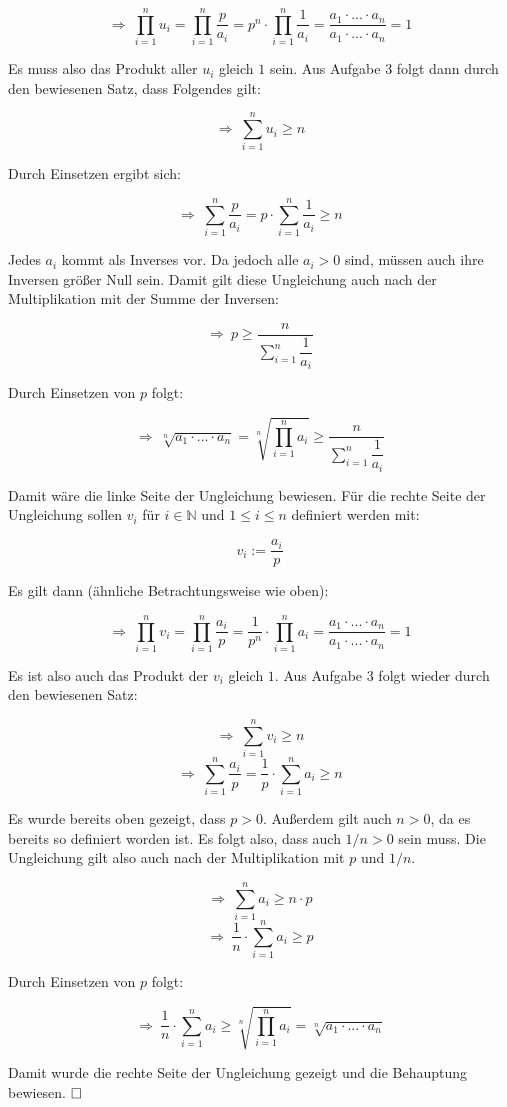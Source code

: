 \documentclass[11pt, a4paper]{article}
\begin{document}
		\[ \Rightarrow \ \prod_{i=1}^n u_i = \prod_{i=1}^n \dfrac{p}{a_i} = p^n \cdot \prod_{i=1}^n \dfrac{1}{a_i} = \dfrac{a_1\cdot ... \cdot a_n}{a_1\cdot ... \cdot a_n} = 1 \]

		Es muss also das Produkt aller $u_i$ gleich $1$ sein. Aus Aufgabe 3 folgt dann durch den bewiesenen Satz, dass Folgendes gilt:

		\[ \Rightarrow \ \sum_{i=1}^n u_i \geq n \]

		Durch Einsetzen ergibt sich:

		\[ \Rightarrow \ \sum_{i=1}^n \dfrac{p}{a_i} = p \cdot \sum_{i=1}^n \dfrac{1}{a_i} \geq n \]

		Jedes $a_i$ kommt als Inverses vor. Da jedoch alle $a_i > 0$ sind, müssen auch ihre Inversen größer Null sein. Damit gilt diese Ungleichung auch nach der Multiplikation mit der Summe der Inversen:

		\[ \Rightarrow \ p \geq \dfrac{n}{\sum_{i=1}^n \dfrac{1}{a_i}} \]

		Durch Einsetzen von $p$ folgt:

		\[ \Rightarrow \ \sqrt[n]{a_1\cdot ... \cdot a_n} = \sqrt[n]{\prod_{i=1}^n a_i} \geq \dfrac{n}{\sum_{i=1}^n \dfrac{1}{a_i}} \]

		Damit wäre die linke Seite der Ungleichung bewiesen. Für die rechte Seite der Ungleichung sollen $v_i$ für $i \in \mathbb{N}$ und $1\leq i \leq n$ definiert werden mit:

		\[ v_i := \dfrac{a_i}{p} \]

		Es gilt dann (ähnliche Betrachtungsweise wie oben):

		\[ \Rightarrow \ \prod_{i=1}^n v_i = \prod_{i=1}^n \dfrac{a_i}{p} = \dfrac{1}{p^n} \cdot \prod_{i=1}^n a_i = \dfrac{a_1\cdot ... \cdot a_n}{a_1\cdot ... \cdot a_n} = 1 \]

		Es ist also auch das Produkt der $v_i$ gleich $1$. Aus Aufgabe 3 folgt wieder durch den bewiesenen Satz:

		\[ \Rightarrow \ \sum_{i=1}^n v_i \geq n \]
		\[ \Rightarrow \ \sum_{i=1}^n \dfrac{a_i}{p} = \dfrac{1}{p} \cdot \sum_{i=1}^n a_i \geq n \]

		Es wurde bereits oben gezeigt, dass $p>0$. Außerdem gilt auch $n>0$, da es bereits so definiert worden ist. Es folgt also, dass auch $1/n > 0$ sein muss. Die Ungleichung gilt also auch nach der Multiplikation mit $p$ und $1/n$.

		\[ \Rightarrow \ \sum_{i=1}^n a_i \geq n\cdot p \]
		\[ \Rightarrow \ \dfrac{1}{n} \cdot \sum_{i=1}^n a_i \geq p \]

		Durch Einsetzen von $p$ folgt:

		\[ \Rightarrow \ \dfrac{1}{n} \cdot \sum_{i=1}^n a_i \geq \sqrt[n]{\prod_{i=1}^n a_i} = \sqrt[n]{a_1\cdot ... \cdot a_n} \]

		Damit wurde die rechte Seite der Ungleichung gezeigt und die Behauptung bewiesen. $\hfill\Box$
\end{document}
